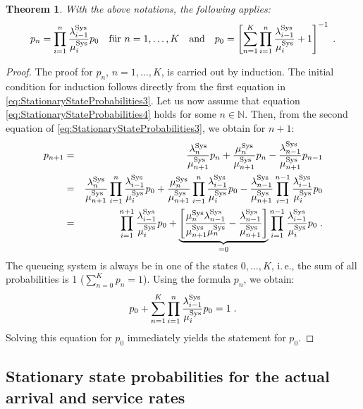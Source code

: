 \documentclass[a4paper,11pt,oneside]{article}
\newtheorem{theorem}{Theorem}
\theoremstyle{definition}
\begin{document}
\begin{theorem}
With the above notations, the following applies:
\begin{equation}
p_n=\prod_{i=1}^n\frac{\lambda_{i-1}^{\rm Sys}}{\mu_i^{\rm Sys}}p_0 ~~~\textrm{für}~ n=1,\ldots,K
~~~\textrm{and}~~~
p_0=\left[\sum_{n=1}^K\prod_{i=1}^n\frac{\lambda_{i-1}^{\rm Sys}}{\mu_i^{\rm Sys}}+1\right]^{-1}\;.
\label{eq:StationaryStateProbabilities4}
\end{equation}
\end{theorem}

\begin{proof}
The proof for $p_n$, $n=1,\ldots,K$, is carried out by induction. The initial condition for induction follows directly from the first equation in \eqref{eq:StationaryStateProbabilities3}. Let us now assume that equation \eqref{eq:StationaryStateProbabilities4} holds for some $n\in\mathbb{N}$. Then, from the second equation of \eqref{eq:StationaryStateProbabilities3}, we obtain for $n+1$:
\begin{eqnarray*}
p_{n+1}&=&
\frac{\lambda_n^{\rm Sys}}{\mu_{n+1}^{\rm Sys}}p_n+\frac{\mu_n^{\rm Sys}}{\mu_{n+1}^{\rm Sys}}p_n-\frac{\lambda_{n-1}^{\rm Sys}}{\mu_{n+1}^{\rm Sys}}p_{n-1}\\&=&
\frac{\lambda_n^{\rm Sys}}{\mu_{n+1}^{\rm Sys}}\prod_{i=1}^n\frac{\lambda_{i-1}^{\rm Sys}}{\mu_i^{\rm Sys}}p_0+
\frac{\mu_n^{\rm Sys}}{\mu_{n+1}^{\rm Sys}}\prod_{i=1}^n\frac{\lambda_{i-1}^{\rm Sys}}{\mu_i^{\rm Sys}}p_0-
\frac{\lambda_{n-1}^{\rm Sys}}{\mu_{n+1}^{\rm Sys}}\prod_{i=1}^{n-1}\frac{\lambda_{i-1}^{\rm Sys}}{\mu_i^{\rm Sys}}p_0\\&=&
\prod_{i=1}^{n+1}\frac{\lambda_{i-1}^{\rm Sys}}{\mu_i^{\rm Sys}}p_0+
\underbrace{\left[\frac{\mu_n^{\rm Sys}\lambda_{n-1}^{\rm Sys}}{\mu_{n+1}^{\rm Sys}\mu_n^{\rm Sys}}-\frac{\lambda_{n-1}^{\rm Sys}}{\mu_{n+1}^{\rm Sys}}\right]}_{=0}
\prod_{i=1}^{n-1}\frac{\lambda_{i-1}^{\rm Sys}}{\mu_i^{\rm Sys}}p_0\;.
\end{eqnarray*}
The queueing system is always be in one of the states $0,\ldots,K$, i.\,e., the sum of all probabilities is 1 ($\sum_{n=0}^Kp_n=1$). Using the formula $p_n$, we obtain:
$$
p_0+\sum_{n=1}^K\prod_{i=1}^n\frac{\lambda_{i-1}^{\rm Sys}}{\mu_i^{\rm Sys}}p_0=1\;.
$$
Solving this equation for $p_0$ immediately yields the statement for $p_0$.
\end{proof}

\subsection{Stationary state probabilities for the actual arrival and service rates}
\end{document}
